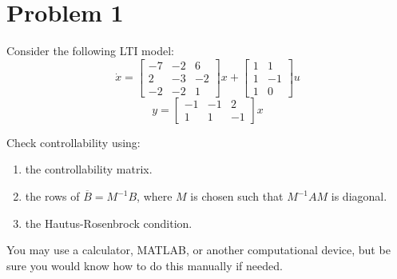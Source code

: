 \documentclass[11pt]{report}
\begin{document}

\section*{Problem 1}

Consider the following LTI model:
\[
\dot x =
\begin{bmatrix}
-7 & -2 & 6 \\
2 & -3 & -2 \\
-2 & -2 & 1
\end{bmatrix}
x +
\begin{bmatrix}
1 & 1 \\
1 & -1 \\
1 & 0
\end{bmatrix}
u
\]
\[
y =
\begin{bmatrix}
-1 & -1 & 2 \\
1 & 1 & -1
\end{bmatrix}
x
\]

Check controllability using:
\begin{enumerate}[label=\alph*)]
\item
the controllability matrix.
\item
the rows of $\overline B = M^{-1} B$, where $M$ is chosen such that $M^{-1} A M$ is diagonal.
\item
the Hautus-Rosenbrock condition.
\end{enumerate}

You may use a calculator, MATLAB, or another computational device, but be sure you would know how to do this manually if needed.

\end{document}
